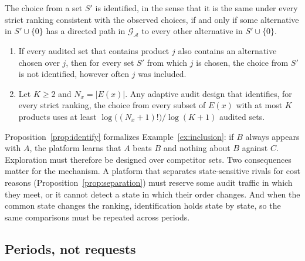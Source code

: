 \documentclass[opre,dblanonrev]{informs4}
\providecommand{\1}{\mathbf{1}}
\begin{document}
\begin{proposition}\label{prop:identify}
The choice from a set $S'$ is identified, in the sense that it is the same under every strict ranking consistent with the observed choices, if and only if some alternative in $S'\cup\{0\}$ has a directed path in $\mathcal G_{\mathcal A}$ to every other alternative in $S'\cup\{0\}$.
\end{proposition}

\begin{corollary}\label{cor:design}
\begin{enumerate}
\item[(a)] If every audited set that contains product $j$ also contains an alternative chosen over $j$, then for every set $S'$ from which $j$ is chosen, the choice from $S'$ is not identified, however often $j$ was included.
\item[(b)] Let $K\ge2$ and $N_x=|E(x)|$. Any adaptive audit design that identifies, for every strict ranking, the choice from every subset of $E(x)$ with at most $K$ products uses at least $\log\bigl((N_x+1)!\bigr)/\log(K+1)$ audited sets.
\end{enumerate}
\end{corollary}

Proposition~\ref{prop:identify} formalizes Example~\ref{ex:inclusion}: if $B$ always appears with $A$, the platform learns that $A$ beats $B$ and nothing about $B$ against $C$. Exploration must therefore be designed over competitor sets. Two consequences matter for the mechanism. A platform that separates state-sensitive rivals for cost reasons (Proposition~\ref{prop:separation}) must reserve some audit traffic in which they meet, or it cannot detect a state in which their order changes. And when the common state changes the ranking, identification holds state by state, so the same comparisons must be repeated across periods.

\subsection{Periods, not requests}\label{sec:learning-periods}
\end{document}
